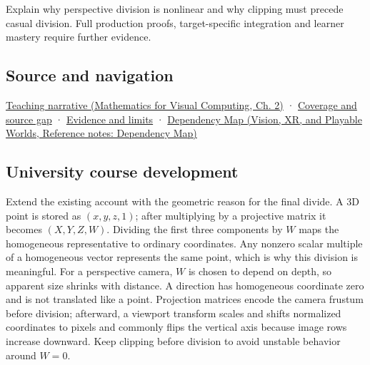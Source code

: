 \hypertarget{appendix-cb3b26862282-recall-and-next-depth}{}

Explain why perspective division is nonlinear and why clipping must precede casual division. Full production proofs, target-specific integration and learner mastery require further evidence.

\subsection{Source and navigation}\label{appendix-cb3b26862282-source-and-navigation}

\hypertarget{appendix-cb3b26862282-source-and-navigation}{}

\href{../02-Mathematics-for-Visual-Computing/main.pdf\#nameddest=01-foundations-i-ch018-homogeneous-coordinates-preserve-the-role-of-a-location}{Teaching narrative (Mathematics for Visual Computing, Ch. 2)} · \hyperref[appendix-fd090d982a15-phase-6---parts-501-600]{Coverage and source gap} · \hyperref[appendix-a103e7846d21-phase-6---source-analysis-and-verification]{Evidence and limits} · \href{../07-Vision-XR-and-Playable-Worlds/main.pdf\#nameddest=appendix-4ad47bdd269a}{Dependency Map (Vision, XR, and Playable Worlds, Reference notes: Dependency Map)}

\subsection{University course development}\label{appendix-cb3b26862282-university-course-development}

\hypertarget{appendix-cb3b26862282-university-course-development}{}

Extend the existing account with the geometric reason for the final divide. A 3D point is stored as \((x,y,z,1)\); after multiplying by a projective matrix it becomes \((X,Y,Z,W)\). Dividing the first three components by \(W\) maps the homogeneous representative to ordinary coordinates. Any nonzero scalar multiple of a homogeneous vector represents the same point, which is why this division is meaningful. For a perspective camera, \(W\) is chosen to depend on depth, so apparent size shrinks with distance. A direction has homogeneous coordinate zero and is not translated like a point. Projection matrices encode the camera frustum before division; afterward, a viewport transform scales and shifts normalized coordinates to pixels and commonly flips the vertical axis because image rows increase downward. Keep clipping before division to avoid unstable behavior around \(W=0\).

